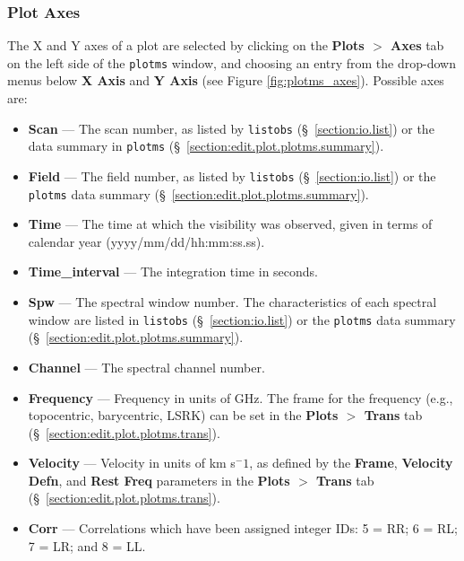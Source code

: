 \subsubsection{Plot Axes}
\label{section:edit.plot.plotms.axes}

The X and Y axes of a plot are selected by clicking on the {\bf Plots $>$ Axes} tab on the left side of the {\tt plotms} window, and choosing an entry from the drop-down menus below {\bf X Axis} and {\bf Y Axis} (see Figure \ref{fig:plotms_axes}). Possible axes are:
\begin{itemize}
\item {\bf Scan} --- The scan number, as listed by {\tt listobs} (\S~\ref{section:io.list}) or the data summary in {\tt plotms} (\S~\ref{section:edit.plot.plotms.summary}).

\item {\bf Field} --- The field number, as listed by {\tt listobs} (\S~\ref{section:io.list}) or the {\tt plotms} data summary (\S~\ref{section:edit.plot.plotms.summary}).

\item {\bf Time} --- The time at which the visibility was observed, given in terms of calendar year (yyyy/mm/dd/hh:mm:ss.ss).

\item {\bf Time\_interval} --- The integration time in seconds.

\item {\bf Spw} --- The spectral window number. The characteristics of each spectral window are listed in {\tt listobs} (\S~\ref{section:io.list}) or the {\tt plotms} data summary (\S~\ref{section:edit.plot.plotms.summary}).

\item {\bf Channel} --- The spectral channel number.

\item {\bf Frequency} --- Frequency in units of GHz. The frame for the frequency (e.g., topocentric, barycentric, LSRK) can be set in the {\bf Plots $>$ Trans} tab (\S~\ref{section:edit.plot.plotms.trans}).

\item {\bf Velocity} --- Velocity in units of km s$^-1$, as defined by the {\bf Frame}, {\bf Velocity Defn}, and {\bf Rest Freq} parameters in the {\bf Plots $>$ Trans} tab (\S~\ref{section:edit.plot.plotms.trans}).

\item {\bf Corr} --- Correlations which have been assigned integer IDs:  5 = RR; 6 = RL; 7 = LR; and 8 = LL.


\end{itemize}
